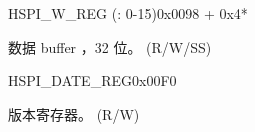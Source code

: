 \begin{register}{H}{SPI\_W\_REG (: 0-15)}{0x0098 + 0x4*}\label{regdesc:SPIW0REG}
%
\regnewline%
\begin{regdesc}\begin{reglist}
\label{fielddesc:SPIBUF0}\item [SPI\_BUF\regindex{n}] 数据 buffer ，32 位。 (R/W/SS)
\end{reglist}\end{regdesc}
\end{register}


\begin{register}{H}{SPI\_DATE\_REG}{0x00F0}\label{regdesc:SPIDATEREG}
%
%
\regnewline%
\begin{regdesc}\begin{reglist}
\label{fielddesc:SPIDATE}\item [SPI\_DATE] 版本寄存器。 (R/W)
\end{reglist}\end{regdesc}
\end{register}
